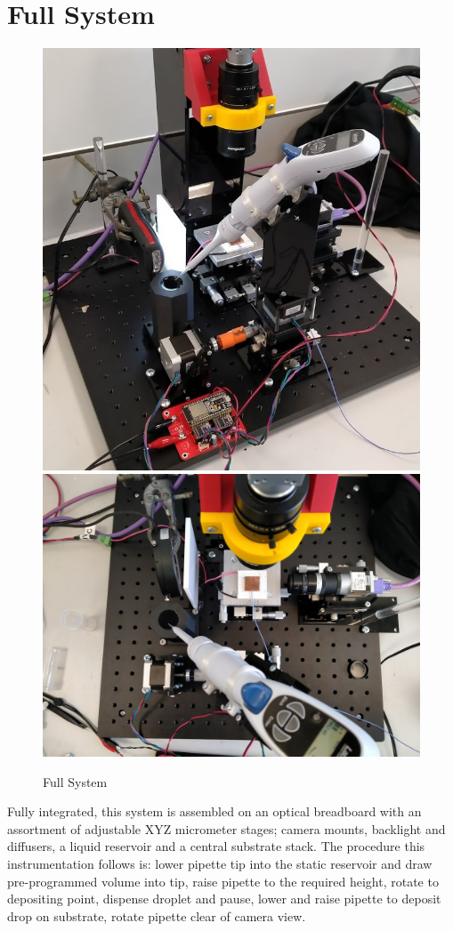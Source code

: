 \section{Full System}

\begin{figure}[h]
    \centering
    \includegraphics[height=0.3\textwidth]{img/full_sys.jpg}
    \includegraphics[height=0.3\textwidth]{img/impl_sys_top.jpg}
    \caption{Full System}
\end{figure}

Fully integrated, this system is assembled on an optical breadboard with an assortment of adjustable XYZ micrometer stages; camera mounts, backlight and diffusers, a liquid reservoir and a central substrate stack. The procedure this instrumentation follows is: lower pipette tip into the static reservoir and draw pre-programmed volume into tip, raise pipette to the required height, rotate to depositing point, dispense droplet and pause, lower and raise pipette to deposit drop on substrate, rotate pipette clear of camera view.